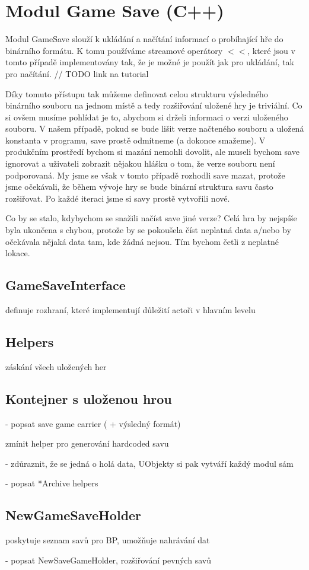 
\section{Modul Game Save (C++)}

Modul GameSave slouží k ukládání a načítání informací o probíhající hře do binárního formátu. K tomu používáme streamové operátory $<<$, které jsou v tomto případě implementovány tak, že je možné je použít jak pro ukládání, tak pro načítání. // TODO link na tutorial

Díky tomuto přístupu tak můžeme definovat celou strukturu výsledného binárního souboru na jednom místě a tedy rozšiřování uložené hry je triviální. Co si ovšem musíme pohlídat je to, abychom si drželi informaci o verzi uloženého souboru. V našem případě, pokud se bude lišit verze načteného souboru a uložená konstanta v programu, save prostě odmítneme (a dokonce smažeme). V produkčním prostředí bychom si mazání nemohli dovolit, ale museli bychom save ignorovat a uživateli zobrazit nějakou hlášku o tom, že verze souboru není podporovaná. My jsme se však v tomto případě rozhodli save mazat, protože jsme očekávali, že během vývoje hry se bude binární struktura savu často rozšiřovat. Po každé iteraci jsme si savy prostě vytvořili nové.

Co by se stalo, kdybychom se snažili načíst save jiné verze? Celá hra by nejspíše byla ukončena s chybou, protože by se pokoušela číst neplatná data a/nebo by očekávala nějaká data tam, kde žádná nejsou. Tím bychom četli z neplatné lokace.

\subsection{GameSaveInterface}
definuje rozhraní, které implementují důležití actoři v hlavním levelu

\subsection{Helpers}
záskání všech uložených her

\subsection{Kontejner s uloženou hrou}


- popsat save game carrier ( + výsledný formát)

zmínit helper pro generování hardcoded savu

- zdůraznit, že se jedná o holá data, UObjekty si pak vytváří každý modul sám

- popsat *Archive helpers 

\subsection{NewGameSaveHolder}

poskytuje seznam savů pro BP, umožňuje nahrávání dat

- popsat NewSaveGameHolder, rozšiřování pevných savů 









